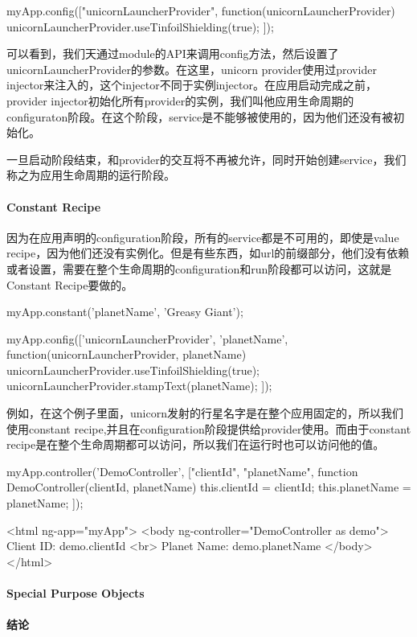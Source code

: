 \begin{JavaScript}
myApp.config(["unicornLauncherProvider", function(unicornLauncherProvider) {
  unicornLauncherProvider.useTinfoilShielding(true);
}]);
\end{JavaScript}


	可以看到，我们天通过module的API来调用config方法，然后设置了unicornLauncherProvider的参数。在这里，unicorn provider使用过provider injector来注入的，这个injector不同于实例injector。在应用启动完成之前，provider injector初始化所有provider的实例，我们叫他应用生命周期的configuraton阶段。在这个阶段，service是不能够被使用的，因为他们还没有被初始化。

	一旦启动阶段结束，和provider的交互将不再被允许，同时开始创建service，我们称之为应用生命周期的运行阶段。


\paragraph{Constant Recipe}

	因为在应用声明的configuration阶段，所有的service都是不可用的，即使是value recipe，因为他们还没有实例化。但是有些东西，如url的前缀部分，他们没有依赖或者设置，需要在整个生命周期的configuration和run阶段都可以访问，这就是Constant Recipe要做的。


\begin{JavaScript}
myApp.constant('planetName', 'Greasy Giant');
\end{JavaScript}


\begin{JavaScript}
myApp.config(['unicornLauncherProvider', 'planetName', function(unicornLauncherProvider, planetName) {
  unicornLauncherProvider.useTinfoilShielding(true);
  unicornLauncherProvider.stampText(planetName);
}]);
\end{JavaScript}

例如，在这个例子里面，unicorn发射的行星名字是在整个应用固定的，所以我们使用constant recipe,并且在configuration阶段提供给provider使用。而由于constant recipe是在整个生命周期都可以访问，所以我们在运行时也可以访问他的值。


\begin{JavaScript}
myApp.controller('DemoController', ["clientId", "planetName", function DemoController(clientId, planetName) {
  this.clientId = clientId;
  this.planetName = planetName;
}]);
\end{JavaScript}

\begin{HTML}
<html ng-app="myApp">
  <body ng-controller="DemoController as demo">
   Client ID: {{demo.clientId}}
   <br>
   Planet Name: {{demo.planetName}}
  </body>
</html>
\end{HTML}


\paragraph{Special Purpose Objects}


\paragraph{结论}



